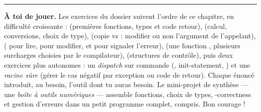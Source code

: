 \documentclass[11pt]{article}
\begin{document}
\bigskip\hrule\bigskip
\noindent\textbf{À toi de jouer.} Les exercices du dossier 
suivent l'ordre de ce chapitre, en difficulté croissante :
 (premières fonctions, types et code retour),
 (calcul, conversions, choix de type),
 (copie vs  : modifier ou non l'argument de
l'appelant),  ( pour lire, \code{\&}
pour modifier, et  pour signaler l'erreur), 
(une fonction , plusieurs surcharges choisies par le
compilateur),  (structures de contrôle), puis deux exercices
plus autonomes : un \emph{dispatch} sur commande (, init-statement,
\code{[[fallthrough]]}) et une \emph{racine sûre} (gérer le cas négatif par
exception ou code de retour). Chaque énoncé introduit, au besoin, l'outil dont
tu auras besoin. Le mini-projet de synthèse — une \emph{boîte à outils
numériques} — assemble fonctions, choix de types, -correctness et
gestion d'erreurs dans un petit programme complet,  compris. Bon
courage !
\end{document}
